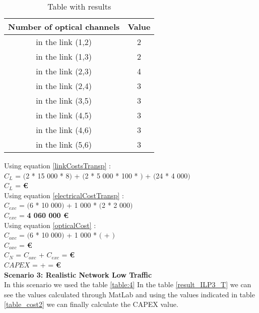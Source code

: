 \begin{table}[h!]
\centering
\begin{tabular}{|| c | c||}
 \hline
 Number of optical channels & Value \\
 \hline\hline
 in the link (1,2) & 2 \\
 in the link (1,3) & 2 \\
 in the link (2,3) & 4 \\
 in the link (2,4) & 3 \\
 in the link (3,5) & 3 \\
 in the link (4,5) & 3 \\
 in the link (4,6) & 3 \\
 in the link (5,6) & 3 \\
 \hline
\end{tabular}
\caption{Table with results}
\label{result_ILP2_T}
\end{table}


Using equation \ref{linkCostsTransp} : \\
$C_L$ = $($2 * 15 000 * 8$)$ + $($2 * 5 000 * 100 * $)$ + $($24 * 4 000$)$ \\
$C_L$ = \textbf{ \euro} \\

Using equation \ref{electricalCostTransp} : \\
$C_{exc}$ = $($6 * 10 000$)$ + 1 000 * $($2 * 2 000$)$ \\
$C_{exc}$ = \textbf{4 060 000 \euro} \\

Using equation \ref{opticalCost} : \\
$C_{oxc}$ = $($6 * 10 000$)$ + 1 000 * $($ + $)$ \\
$C_{oxc}$ = \textbf{ \euro} \\
$C_N$ = $C_{oxc}$ + $C_{exc}$ = \textbf{ \euro} \\

$CAPEX$ =  +  = \textbf{ \euro}\\


\vspace{11pt}
\textbf{Scenario 3: Realistic Network Low Traffic} \label{Scenario3_transp} \\
In this scenario we used the table \ref{table:4} In the table \ref{result_ILP3_T} we can see the values calculated through MatLab and using the values indicated in table \ref{table_cost2} we can finally calculate the CAPEX value. \\

